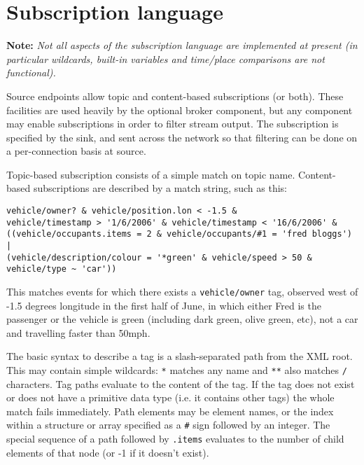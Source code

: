 \documentclass[12pt,a4paper,twoside]{article}
\renewcommand{\_}{\texttt{\symbol{95}}}
\begin{document}
\newpage
\section{Subscription language}

\textbf{Note:} \textit{Not all aspects of the subscription language are
implemented at present (in particular wildcards, built-in variables and
time/place comparisons are not functional).}

Source endpoints allow topic and content-based subscriptions
(or both). These facilities are used heavily by the optional broker
component, but any component may enable subscriptions in order to
filter stream output. The subscription is specified by the sink,
and sent across the network so that filtering can be done on a
per-connection basis at source.

Topic-based subscription consists of a simple match on topic name.
Content-based subscriptions are described by a match string, such as this:

\begin{verbatim}
vehicle/owner? & vehicle/position.lon < -1.5 &
vehicle/timestamp > '1/6/2006' & vehicle/timestamp < '16/6/2006' &
((vehicle/occupants.items = 2 & vehicle/occupants/#1 = 'fred bloggs') |
(vehicle/description/colour = '*green' & vehicle/speed > 50 &
vehicle/type ~ 'car'))
\end{verbatim}

This matches events for which there exists a \verb^vehicle/owner^ tag, observed
west of -1.5 degrees longitude in the first half of June, in which either Fred
is the passenger or the vehicle is green (including dark green, olive green,
etc), not a car and travelling faster than 50mph.

The basic syntax to describe a tag is a slash-separated path from
the XML root. This may contain simple wildcards: \verb^*^ matches
any name and \verb^**^ also matches \verb^/^ characters. Tag paths
evaluate to the
content of the tag. If the tag does not exist or does not have a
primitive data type (i.e. it contains other tags)
the whole match fails immediately. Path elements may be element names,
or the index within a structure or array specified as a \verb^#^ sign
followed by an integer.
The special sequence of a path followed by \verb^.items^ evaluates
to the number of child elements of that node (or -1 if it doesn't exist).

\end{document}
